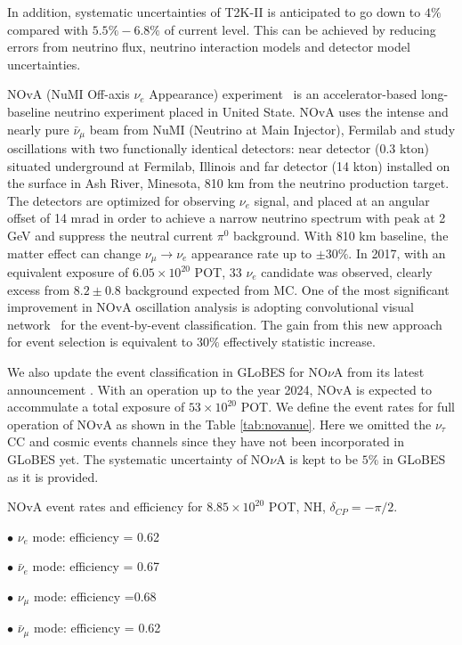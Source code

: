 \documentclass[a4 paper,12pt]{report}%
\begin{document}
\noindent In addition, systematic uncertainties of T2K-II is anticipated to go down to $4\%$ compared with $5.5\% - 6.8\%$ of current level. This can be achieved by reducing errors from neutrino flux, neutrino interaction models and detector model uncertainties.



NOvA (NuMI Off-axis $\nu_e$ Appearance) experiment~\cite{Ayres:2004js} is an accelerator-based long-baseline neutrino experiment placed in United State. NOvA uses the intense and nearly pure $\bar{\nu}_{\mu}$ beam from NuMI (Neutrino at Main Injector), Fermilab  and study oscillations with two functionally identical detectors: near detector (0.3 kton) situated underground at Fermilab, Illinois and far detector (14 kton) installed on the surface in Ash River, Minesota, 810 km from the neutrino production target. The detectors are optimized for observing $\nu_e$ signal, and placed at an angular offset of 14 mrad in order to achieve a narrow neutrino spectrum with peak at 2 GeV and suppress the neutral current $\pi^0$ background. With 810 km baseline, the matter effect can change $\nu_{\mu}\rightarrow \nu_e$ appearance rate up to $\pm 30\%$. In 2017, with an equivalent exposure of $6.05\times 10^{20}$ POT, 33 $\nu_e$ candidate was observed, clearly excess from $8.2\pm 0.8$ background expected from MC. One of the most significant improvement in NOvA oscillation analysis is adopting convolutional visual network~\cite{Aurisano:2016jvx} for the event-by-event classification. The gain from this new approach for event selection is equivalent to 30$\%$ effectively statistic increase.


We also update the event classification in GLoBES for NO$\nu$A from its latest announcement \cite{Adamson:2017gxd}. With an operation up to the year 2024, NOvA is expected to accommulate a total exposure of $53 \times 10^{20}$ POT. We define the event rates for full operation of NOvA as shown in the Table \ref{tab:novanue}. Here we omitted the $\nu_\tau$ CC and cosmic events channels since they have not been incorporated in GLoBES yet. The systematic uncertainty of NO$\nu$A is kept to be $5\%$ in GLoBES as it is provided.\par 
NOvA event rates and efficiency for $8.85 \times 10^{20}$ POT, NH, $\delta_{CP} = -\pi/2$.\par
$\bullet$ $\nu_e$ mode: efficiency = 0.62\par 
$\bullet$ $\bar{\nu}_e$ mode: efficiency = 0.67\par 
$\bullet$ $\nu_\mu$ mode: efficiency =0.68\par 
$\bullet$ $\bar{\nu}_\mu$ mode: efficiency = 0.62\par 
\end{document}
